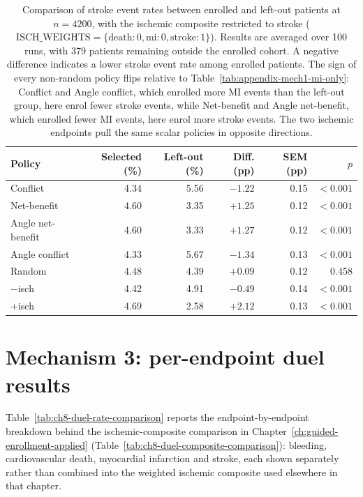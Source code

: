 \begin{table}[htbp]
    \centering
    \small
    \setlength{\tabcolsep}{6pt}
    \begin{tabular}{lrrrrr}
        \toprule
        Policy & Selected (\%) & Left-out (\%) & Diff. (pp) & SEM (pp) & $p$ \\
        \midrule
        Conflict           & 4.34 & 5.56 & $-1.22$ & 0.15 & $<0.001$ \\
        Net-benefit        & 4.60 & 3.35 & $+1.25$ & 0.12 & $<0.001$ \\
        Angle net-benefit  & 4.60 & 3.33 & $+1.27$ & 0.12 & $<0.001$ \\
        Angle conflict     & 4.33 & 5.67 & $-1.34$ & 0.13 & $<0.001$ \\
        Random             & 4.48 & 4.39 & $+0.09$ & 0.12 & 0.458 \\
        $-$isch            & 4.42 & 4.91 & $-0.49$ & 0.14 & $<0.001$ \\
        $+$isch            & 4.69 & 2.58 & $+2.12$ & 0.13 & $<0.001$ \\
        \bottomrule
    \end{tabular}
    \caption{Comparison of stroke event rates between enrolled and left-out patients at
    $n=4200$, with the ischemic composite restricted to stroke
    ($\text{ISCH\_WEIGHTS} = \{\text{death}: 0, \text{mi}: 0, \text{stroke}: 1\}$).
    Results are averaged over 100 runs, with 379 patients remaining outside the enrolled
    cohort. A negative difference indicates a lower stroke event rate among enrolled
    patients. The sign of every non-random policy flips relative to
    Table~\ref{tab:appendix-mech1-mi-only}: Conflict and Angle conflict, which enrolled
    more MI events than the left-out group, here enrol fewer stroke events, while
    Net-benefit and Angle net-benefit, which enrolled fewer MI events, here enrol more
    stroke events. The two ischemic endpoints pull the same scalar policies in opposite
    directions.}
    \label{tab:appendix-mech1-stroke-only}
\end{table}

\section{Mechanism 3: per-endpoint duel results}

Table~\ref{tab:ch8-duel-rate-comparison} reports the endpoint-by-endpoint breakdown
behind the ischemic-composite comparison in Chapter~\ref{ch:guided-enrollment-applied}
(Table~\ref{tab:ch8-duel-composite-comparison}): bleeding, cardiovascular death,
myocardial infarction and stroke, each shown separately rather than combined into the
weighted ischemic composite used elsewhere in that chapter.

